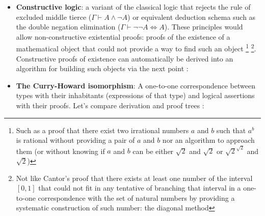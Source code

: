 \documentclass{article}
\begin{document}
        \begin{itemize}
            \item \textbf{Constructive logic}: a variant of the classical logic that rejects the rule of excluded middle tierce ($\Gamma\vdash A \wedge \neg A$) or equivalent deduction schema such as the double negation elimination ($\Gamma\vdash \neg\neg A \Longleftrightarrow A$). These principles would allow non-constructive existential proofs: proofs of the existence of a mathematical object that could not provide a way to find such an object \footnote{Such as a proof that there exist two irrational numbers $a$ and $b$ such that $a^b$ is rational without providing a pair of $a$ and $b$ nor an algorithm to approach them (or without knowing if $a$ and $b$ can be either $\sqrt{2}$ and $\sqrt{2}$ or $\sqrt{2}^{\sqrt{2}}$ and $\sqrt{2}$)}
            \footnote{Not like Cantor's proof that there exists at least one number of the interval $[0,1]$ that could not fit in any tentative of branching that interval in a one-to-one correspondence with the set of natural numbers by providing a systematic construction of such number: the diagonal method}.
            Constructive proofs of existence can automatically be derived into an algorithm for building such objects via the next point :
            
            \item \textbf{The Curry-Howard isomorphism}: A one-to-one correspondence between types with their inhabitants (expressions of that type) and logical assertions with their proofs. Let's compare derivation and proof trees :


\end{itemize}
\end{document}
